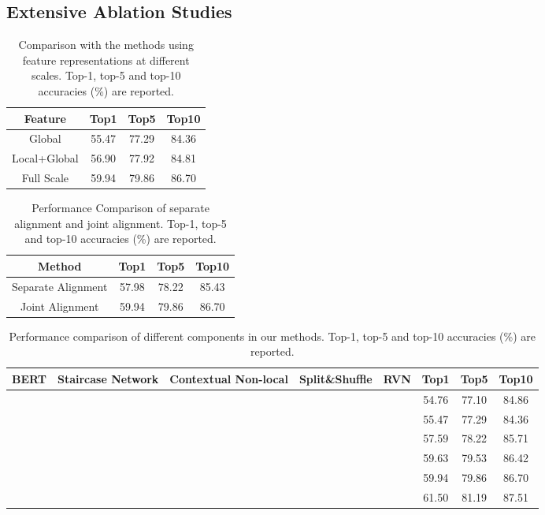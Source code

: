 \documentclass[final]{cvpr}
\begin{document}
\subsection{Extensive Ablation Studies}
\begin{table}[t]
\centering
\caption{Comparison with the methods using feature representations at different scales. Top-1, top-5 and top-10 accuracies  (\%) are reported.}
\label{tab_different_level_feature_performance}
\begin{tabular}{c|ccc}
\hline
Feature& Top1& Top5& Top10\\
\hline
Global& 55.47& 77.29& 84.36\\
Local+Global& 56.90& 77.92& 84.81\\
Full Scale& 59.94& 79.86& 86.70\\
\hline
\end{tabular}
\end{table}

\begin{table}
\centering
\caption{Performance Comparison of separate alignment and joint alignment. Top-1, top-5 and top-10 accuracies (\%) are reported.}
\label{tab_different_alignment_performance}
\begin{tabular}{c|ccc}
\hline
Method& Top1& Top5& Top10\\
\hline
Separate Alignment& 57.98& 78.22& 85.43\\
Joint Alignment& 59.94& 79.86& 86.70\\
\hline
\end{tabular}
\end{table}

\begin{table*}
\centering
\caption{Performance comparison of different components in our methods. Top-1, top-5 and top-10 accuracies (\%) are  reported.}
\label{tab_different_module_performance}
\begin{tabular}{ccccc|ccc}
\hline
BERT& Staircase Network& Contextual Non-local& Split\&Shuffle & RVN & Top1& Top5& Top10\\
\hline
& & & & & 54.76& 77.10& 84.86\\
& & & & & 55.47& 77.29& 84.36\\
& & & & & 57.59& 78.22& 85.71\\
& & & & & 59.63& 79.53& 86.42\\
& & & & & 59.94& 79.86& 86.70\\
& & & & & 61.50& 81.19& 87.51\\
\hline
\end{tabular}
\end{table*}
\end{document}
